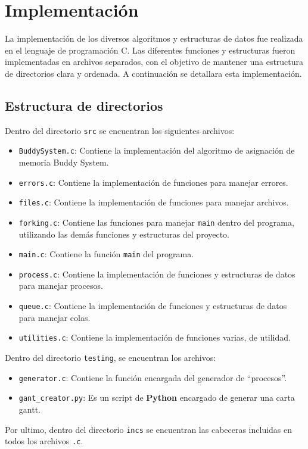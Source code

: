 \section{Implementación}
La implementación de los diversos algoritmos y estructuras de datos fue realizada en el lenguaje de programación C. Las diferentes funciones y estructuras fueron implementadas en archivos separados, con el objetivo de mantener una estructura de directorios clara y ordenada. A continuación se detallara esta implementación.

\subsection{Estructura de directorios}
Dentro del directorio \texttt{src} se encuentran los siguientes archivos:
\begin{itemize}
    \item \texttt{BuddySystem.c}: Contiene la implementación del algoritmo de asignación de memoria Buddy System.
    \item \texttt{errors.c}: Contiene la implementación de funciones para manejar errores.
    \item \texttt{files.c}: Contiene la implementación de funciones para manejar archivos.
    \item \texttt{forking.c}: Contiene las funciones para manejar \texttt{main} dentro del programa, utilizando las demás funciones y estructuras del proyecto.
    \item \texttt{main.c}: Contiene la función \texttt{main} del programa.
    \item \texttt{process.c}: Contiene la implementación de funciones y estructuras de datos para manejar procesos.
    \item \texttt{queue.c}: Contiene la implementación de funciones y estructuras de datos para manejar colas.
    \item \texttt{utilities.c}: Contiene la implementación de funciones varias, de utilidad.
\end{itemize}

Dentro del directorio \texttt{testing}, se encuentran los archivos:
\begin{itemize} 
    \item \texttt{generator.c}: Contiene la función encargada del generador de ``procesos''.
    \item\texttt{gant\_creator.py}: Es un script de \textbf{Python} encargado de generar una carta gantt.
\end{itemize}
Por ultimo, dentro del directorio \texttt{incs} se encuentran las cabeceras incluidas en todos los archivos \texttt{.c}.


